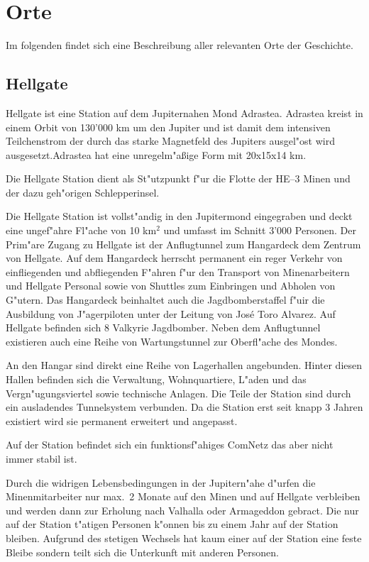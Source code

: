 \section{Orte}

Im folgenden findet sich eine Beschreibung aller relevanten Orte der Geschichte.

\subsection{Hellgate}

Hellgate ist eine Station auf dem Jupiternahen Mond Adrastea. Adrastea kreist in einem Orbit von 130'000 km um den Jupiter und
ist damit dem intensiven Teilchenstrom der durch das starke Magnetfeld des Jupiters ausgel"ost wird ausgesetzt.Adrastea hat eine unregelm"aßige Form mit 20x15x14 km.

Die Hellgate Station dient als St"utzpunkt f"ur die Flotte der HE--3 Minen und der dazu geh"origen Schlepperinsel. 

Die Hellgate Station ist vollst"andig in den Jupitermond eingegraben und deckt eine ungef"ahre Fl"ache von 10 km$^{2}$ und umfasst im Schnitt 3'000 Personen. Der Prim"are Zugang zu Hellgate ist der Anflugtunnel zum Hangardeck dem Zentrum von Hellgate. Auf dem Hangardeck herrscht permanent ein reger Verkehr von einfliegenden und abfliegenden F"ahren f"ur den Transport von Minenarbeitern und Hellgate Personal sowie von Shuttles zum Einbringen und Abholen von G"utern. Das Hangardeck beinhaltet auch die Jagdbomberstaffel f"uir die Ausbildung von J"agerpiloten unter der Leitung von Jos\'{e} \frqq{}Toro\flqq{} Alvarez. Auf Hellgate befinden sich 8 Valkyrie Jagdbomber. Neben dem Anflugtunnel existieren auch eine Reihe von Wartungstunnel zur Oberfl"ache des Mondes.

An den Hangar sind direkt eine Reihe von Lagerhallen angebunden. Hinter diesen Hallen befinden sich die Verwaltung, Wohnquartiere, L"aden und das Vergn"ugungsviertel sowie technische Anlagen. Die Teile der Station sind durch ein ausladendes Tunnelsystem verbunden. Da die Station erst seit knapp 3 Jahren existiert wird sie permanent erweitert und angepasst.

Auf der Station befindet sich ein funktionsf"ahiges ComNetz das aber nicht immer stabil ist.

Durch die widrigen Lebensbedingungen in der Jupitern"ahe d"urfen die Minenmitarbeiter nur max.~2 Monate auf den Minen und auf Hellgate verbleiben und werden dann zur Erholung nach Valhalla oder Armageddon gebract. Die nur auf der Station t"atigen Personen k"onnen bis zu einem Jahr auf der Station bleiben. Aufgrund des stetigen Wechsels hat kaum einer auf der Station eine feste Bleibe sondern teilt sich die Unterkunft mit anderen Personen.


